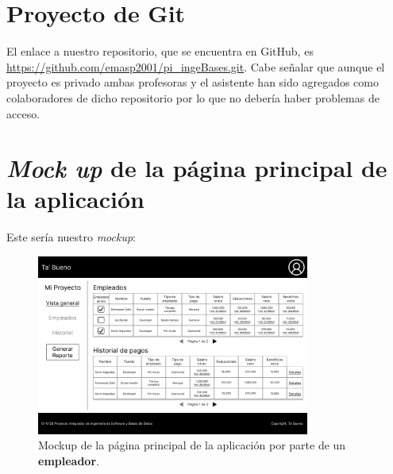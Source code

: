 \documentclass{article}
\begin{document}
\section{Proyecto de Git}
El enlace a nuestro repositorio, que se encuentra en GitHub, es
\url{https://github.com/emasp2001/pi_ingeBases.git}. Cabe señalar que
aunque el proyecto es privado ambas profesoras y el asistente han sido
agregados como colaboradores de dicho repositorio por lo que no debería
haber problemas de acceso.

\section{\textit{Mock up} de la página principal de la aplicación}
Este sería nuestro \textit{mockup}:
\begin{figure}[h]
  \centering
  \includegraphics[width=0.8\textwidth]{mockup.png}
  \caption{Mockup de la página principal de la aplicación por parte de un \textbf{empleador}.}
  \label{fig:mockup}
\end{figure}


%
%
\end{document}
